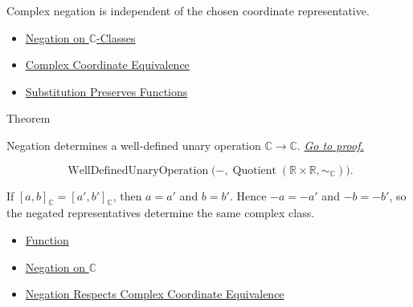 \begin{remark*}[Interpretation]
Complex negation is independent of the chosen coordinate representative.
\end{remark*}

\begin{dependencies}
\begin{itemize}
  \item \hyperref[def:negation-on-c-classes]{Negation on $\mathbb{C}$-Classes}
  \item \hyperref[def:complex-coordinate-equivalence]{Complex Coordinate Equivalence}
  \item \hyperref[prop:substitution-preserves-functions]{Substitution Preserves Functions}
\end{itemize}
\end{dependencies}

\begin{theorembox}{Theorem}
\begin{theorem}
\label{thm:negation-on-c-well-defined}
Negation determines a well-defined unary operation $\mathbb{C}\to\mathbb{C}$.
\hyperref[prf:negation-on-c-well-defined]{\textit{Go to proof.}}
\end{theorem}
\end{theorembox}

\begin{remark*}
\[
\operatorname{WellDefinedUnaryOperation}
\bigl(-, \operatorname{Quotient}(\mathbb{R}\times\mathbb{R},\sim_{\mathbb{C}})\bigr).
\]
\end{remark*}

\begin{remark*}[Interpretation]
If \([a,b]_{\mathbb{C}}=[a',b']_{\mathbb{C}}\), then \(a=a'\) and
\(b=b'\). Hence \(-a=-a'\) and \(-b=-b'\), so the negated representatives
determine the same complex class.
\end{remark*}

\begin{dependencies}
\begin{itemize}
  \item \hyperref[def:function]{Function}
  \item \hyperref[def:negation-on-c-classes]{Negation on $\mathbb{C}$}
  \item \hyperref[lem:negation-on-c-respects-equivalence]{Negation Respects Complex Coordinate Equivalence}
\end{itemize}
\end{dependencies}

